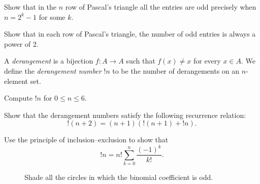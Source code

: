 \begin{challenge}
  \exercise
  \begin{subexenum}
  \item Show that in the $n$\supth{} row of Pascal's triangle all the entries are odd precisely when $n=2^k-1$ for some $k$.
  \item Show that in each row of Pascal's triangle, the number of odd entries is always a power of $2$.
  \end{subexenum}
  \exercise A \emph{derangement} is a bijection $f:A\to A$ such that $f(x)\neq x$ for every $x\in A$. We define the \emph{derangement number} $!n$ to be the number of derangements on an $n$-element set.
  \begin{subexenum}
  \item Compute $!n$ for $0\leq n\leq 6$.
  \item Show that the derangement numbers satisfy the following recurrence relation:
    \begin{equation*}
      {!(n+2)}=(n+1)({!(n+1)}+{!n}).
    \end{equation*}
  \item Use the principle of inclusion--exclusion to show that
    \begin{equation*}
      !n= {n!}\sum_{k=0}^n \frac{(-1)^k}{k!}.
    \end{equation*}
  \end{subexenum}
\end{challenge}

\cleardoublepage

\thispagestyle{empty}

\begin{figure}[p]

  \caption[Parity in Pascal's triangle]
  {Shade all the circles in which the binomial coefficient is odd.}
  \label{figure:parity-pascals-triangle}
\end{figure}

\clearpage

\thispagestyle{empty}

